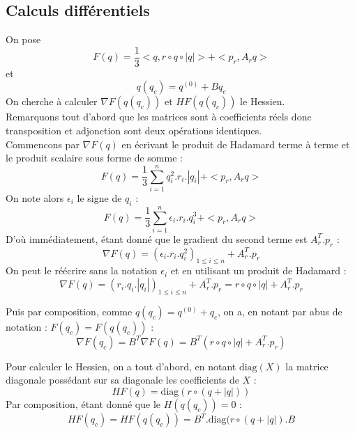 \documentclass{article}
\begin{document}
    \subsection{Calculs différentiels}
        On pose \[ F(q) = \frac{1}{3}<q, r \circ q \circ |q|> + <p_r, A_rq> \] et \[q(q_c) = q^{(0)} + Bq_c \]
        On cherche à calculer $\nabla F(q(q_c))$ et $H F(q(q_c))$ le Hessien.\\
        Remarquons tout d'abord que les matrices sont à coefficients réels donc transposition et adjonction sont deux opérations identiques.\\
        Commencons par $\nabla F(q)$ en écrivant le produit de Hadamard terme à terme et le produit scalaire sous forme de somme :
        \[ F(q) = \frac{1}{3}\sum_{i = 1}^n q_i^2.r_i.|q_i| + <p_r, A_rq>\]
        On note alors $\epsilon_i$ le signe de $q_i$ :
        \[ F(q) = \frac{1}{3}\sum_{i = 1}^n \epsilon_i.r_i.q_i^3 + <p_r, A_rq>\]
        D'où immédiatement, étant donné que le gradient du second terme est $A_r^T.p_r$ :
        \[\nabla F(q) = (\epsilon_i.r_i.q_i^2)_{1 \leq i \leq n} + A_r^T.p_r\]
        On peut le réécrire sans la notation $\epsilon_i$ et en utilisant un produit de Hadamard : 
        \[ \boxed{\nabla F(q) = (r_i.q_i.|q_i|)_{1 \leq i \leq n} + A_r^T.p_r
            = r\circ q \circ |q| + A_r^T.p_r}\]

        Puis par composition, comme $q(q_c) = q^{(0)} + q_c$, on a, en notant par abus de notation : $F(q_c) = F(q(q_c))$ :
        \[ \boxed{\nabla F(q_c) = B^T\nabla F(q) = B^T(r\circ q \circ |q| + A_r^T.p_r)  
        }\]

        Pour calculer le Hessien, on a tout d'abord, en notant $\text{diag}(X)$ la matrice diagonale possédant sur sa diagonale les coefficients de $X$ :
        \[H F(q) = \text{diag}(r\circ(q + |q|))\]
        Par composition, étant donné que le $H(q(q_c)) = 0$ :
        \[ \boxed{H F(q_c) = H F(q(q_c)) = B^T.\text{diag}(r\circ(q + |q|).B}
        \] 

    \paragraph{}
\section{}



\end{document}
